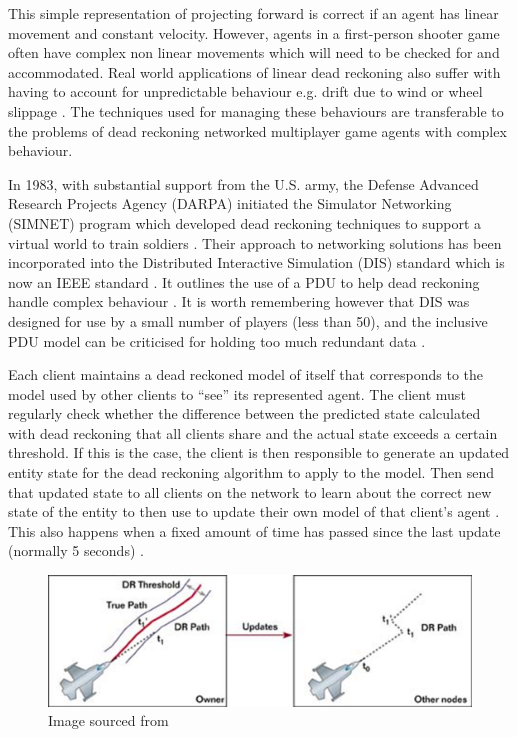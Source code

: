 \documentclass[journal]{IEEEtran}
\begin{document}
This simple representation of projecting forward is correct if an agent has linear movement and constant velocity. However, agents in a first-person shooter game often have complex non linear movements which will need to be checked for and accommodated. Real world applications of linear dead reckoning also suffer with having to account for unpredictable behaviour e.g. drift due to wind or wheel slippage \cite{chung2001accurate} \cite{ojeda2004experimental}. The techniques used for managing these behaviours are transferable to the problems of dead reckoning networked multiplayer game agents with complex behaviour.

In 1983, with substantial support from the U.S. army, the Defense Advanced Research Projects Agency (DARPA) initiated the Simulator Networking (SIMNET) program which developed dead reckoning techniques to support a virtual world to train soldiers \cite{calvin1993simnet}. Their approach to networking solutions has been incorporated into the Distributed Interactive Simulation (DIS) standard which is now an IEEE standard \cite{dis1998ieee}. It outlines the use of a PDU to help dead reckoning handle complex behaviour \cite{mccarty1994virtual}. It is worth remembering however that DIS was designed for use by a small number of players (less than 50), and the inclusive PDU model can be criticised for holding too much redundant data \cite{henderson2001latency}.
 
Each client maintains a dead reckoned model of itself that corresponds to the model used by other clients to ``see'' its represented agent. The client must regularly check whether the difference between the predicted state calculated with dead reckoning that all clients share and the actual state exceeds a certain threshold. If this is the case, the client is then responsible to generate an updated entity state for the dead reckoning algorithm to apply to the model. Then send that updated state to all clients on the network to learn about the correct new state of the entity to then use to update their own model of that client's agent \cite{calvin1993simnet} \cite{mauve2000keep}. This also happens when a fixed amount of time has passed since the last update (normally 5 seconds) \cite{mills1992network}.

\begin{figure}[h]
    \centering
    \includegraphics[width=0.8\linewidth]{Threshold1.png}
    \caption{Image sourced from \cite{aronson1997gamasutra}}
    \label{fig:threshold}
\end{figure}
\end{document}
